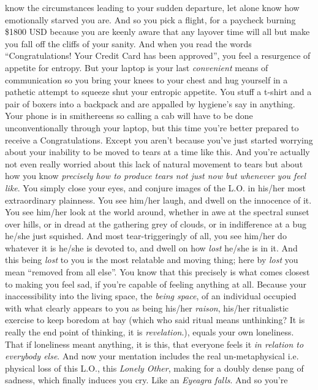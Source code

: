 \documentclass{article}
\begin{document}
know the circumstances leading to your sudden departure, let alone know
how emotionally starved you are. And so you pick a flight, for
a paycheck burning \$1800 USD because you are keenly aware that any
layover time will all but make you fall off the cliffs of your sanity.
And when you read the words ``Congratulations! Your Credit Card has been
approved'', you feel a resurgence of appetite for entropy. But your
laptop is your last \textit{convenient} means of communication so you
bring your knees to your chest and hug yourself in a pathetic attempt to
squeeze shut your entropic appetite. You stuff a t-shirt and a pair of
boxers into a backpack and are appalled by hygiene's say in anything.
Your phone is in smithereens so calling a cab will have to be done
unconventionally through your laptop, but this time you're better
prepared to receive a Congratulations. Except you aren't because you've
just started worrying about your inability to be moved to  tears at
a time like this. And you're actually not even really worried about this
lack of natural movement to tears but about how you know
\textit{precisely how to produce tears not just now but whenever you
feel like}. You simply close your eyes, and conjure images of the L.O.
in his/her most extraordinary plainness. You see him/her laugh, and
dwell on the innocence of it. You see him/her look at the world around,
whether in awe at the spectral sunset over hills, or in dread at the
gathering grey of clouds, or in indifference at a bug he/she just
squished. And most tear-triggeringly of all, you see him/her do whatever
it is he/she is devoted to, and dwell on how \textit{lost} he/she is in
it. And this being \textit{lost} to you is the most relatable and moving
thing; here by \textit{lost} you mean ``removed from all else''. You
know that this precisely is what comes closest to making you feel sad,
if you're capable of feeling anything at all. Because your
inaccessibility into the living space, the \textit{being space}, of an
individual occupied with what clearly appears to you as being his/her
\textit{raison}, his/her ritualistic exercise to keep boredom at bay
(which who said ritual means unthinking? It is really the end point of
thinking, it is \textit{revelation}.), equals your own loneliness. That
if loneliness meant anything, it is this, that everyone feels it
\textit{in relation to everybody else}. And now your mentation includes
the real un-metaphysical i.e. physical loss of this L.O., this
\textit{Lonely Other}, making for a doubly dense pang of sadness, which
finally induces you cry. Like an \textit{Eyeagra falls}. And so you're
\end{document}
